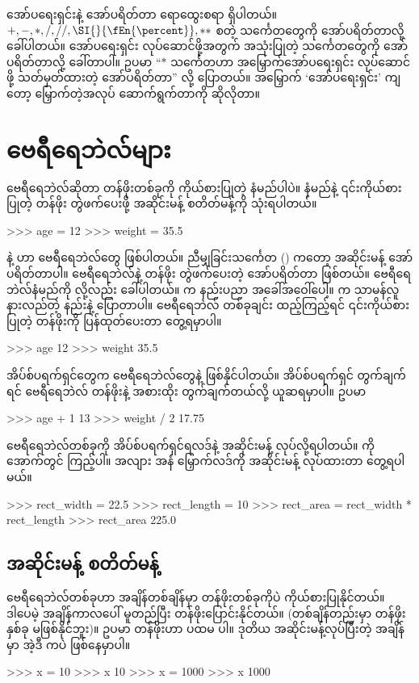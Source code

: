 \begin{mytcbox}
အော်ပရေးရှင်းနဲ့ အော်ပရိတ်တာ ရောထွေးစရာ ရှိပါတယ်။ $+, -, *, /, //, \SI{}{\fEn{\percent}}, **$ စတဲ့ သင်္ကေတတွေကို အော်ပရိတ်တာလို့ ခေါ်ပါတယ်။ အော်ပရေးရှင်း လုပ်ဆောင်ဖို့အတွက် အသုံးပြုတဲ့ သင်္ကေတတွေကို အော်ပရိတ်တာလို့ ခေါ်တာပါ။ ဥပမာ “$*$ သင်္ကေတဟာ အမြှောက်အော်ပရေးရှင်း လုပ်ဆောင်ဖို့ သတ်မှတ်ထားတဲ့ အော်ပရိတ်တာ” လို့ ပြောတယ်။ အမြှောက်  ‘အော်ပရေးရှင်း’ ကျတော့ မြှောက်တဲ့အလုပ် ဆောက်ရွက်တာကို ဆိုလိုတာ။
\end{mytcbox}


\section{ဗေရီရေဘဲလ်များ}
ဗေရီရေဘဲလ်ဆိုတာ တန်ဖိုးတစ်ခုကို ကိုယ်စားပြုတဲ့ နံမည်ပါပဲ။ နံမည်နဲ့ ၎င်းကိုယ်စားပြုတဲ့ တန်ဖိုး တွဲဖက်ပေးဖို့ အဆိုင်းမန့်  စတိတ်မန့်ကို သုံးရပါတယ်။
%
\setlength{\fboxsep}{0pt}
\begin{codetxt}
>>> age = 12
>>> weight = 35.5
\end{codetxt}
%
 နဲ့  ဟာ ဗေရီရေဘဲလ်တွေ ဖြစ်ပါတယ်။   ညီမျှခြင်းသင်္ကေတ (\fCode{=}) ကတော့ အဆိုင်းမန့် အော်ပရိတ်တာပါ။ ဗေရီရေဘဲလ်နဲ့ တန်ဖိုး တွဲဖက်ပေးတဲ့ အော်ပရိတ်တာ ဖြစ်တယ်။ ဗေရီရေဘဲလ်နံမည်ကို   လို့လည်း ခေါ်ပါတယ်။  က နည်းပညာ အခေါ်အဝေါ်ပေါ့။  က သာမန်လူ နားလည်တဲ့ နည်းနဲ့ ပြောတာပါ။ ဗေရီရေဘဲလ် တစ်ခုချင်း ထည့်ကြည့်ရင် ၎င်းကိုယ်စားပြုတဲ့ တန်ဖိုးကို ပြန်ထုတ်ပေးတာ တွေ့ရမှာပါ။
%
\setlength{\fboxsep}{0pt}
\begin{codetxt}
>>> age
12
>>> weight
35.5
\end{codetxt}

%
အိပ်စ်ပရက်ရှင်တွေက ဗေရီရေဘဲလ်တွေနဲ့ ဖြစ်နိုင်ပါတယ်။ အိပ်စ်ပရက်ရှင် တွက်ချက်ရင် ဗေရီရေဘဲလ် တန်ဖိုးနဲ့ အစားထိုး တွက်ချက်တယ်လို့ ယူဆရမှာပါ။ ဥပမာ
%
\setlength{\fboxsep}{0pt}
\begin{codetxt}
>>> age + 1
13
>>> weight / 2
17.75
\end{codetxt}
%
ဗေရီရေဘဲလ်တစ်ခုကို အိပ်စ်ပရက်ရှင်ရလဒ်နဲ့ အဆိုင်းမန့် လုပ်လို့ရပါတယ်။  ကို အောက်တွင် ကြည့်ပါ။ အလျား အနံ မြှောက်လဒ်ကို အဆိုင်းမန့် လုပ်ထားတာ တွေ့ရပါမယ်။
%
\setlength{\fboxsep}{0pt}
\begin{codetxt}
>>> rect_width = 22.5
>>> rect_length = 10
>>> rect_area = rect_width * rect_length
>>> rect_area
225.0
\end{codetxt}
%


\subsection*{အဆိုင်းမန့် စတိတ်မန့်}
ဗေရီရေဘဲလ်တစ်ခုဟာ အချိန်တစ်ချိန်မှာ တန်ဖိုးတစ်ခုကိုပဲ ကိုယ်စားပြုနိုင်တယ်။ ဒါပေမဲ့ အချိန်ကာလပေါ် မူတည်ပြီး တန်ဖိုးပြောင်းနိုင်တယ်။ (တစ်ချိန်တည်းမှာ တန်ဖိုးနှစ်ခု မဖြစ်နိုင်ဘူး)။ ဥပမာ  တန်ဖိုးဟာ ပထမ  ပါ။ ဒုတိယ အဆိုင်းမန့်လုပ်ပြီးတဲ့ အချိန်မှာ အဲ့ဒီ  ကပဲ  ဖြစ်နေမှာပါ။ 
%
\setlength{\fboxsep}{0pt}
\begin{codetxt}
>>> x = 10
>>> x
10
>>> x = 1000
>>> x
1000
\end{codetxt}
%

